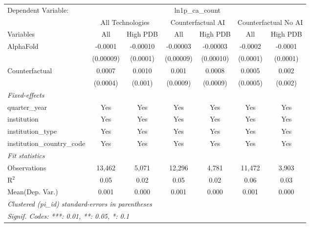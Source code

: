 \begingroup
\centering
\begin{tabular}{lcccccc}
   \tabularnewline \midrule \midrule
   Dependent Variable: & \multicolumn{6}{c}{ln1p\_ca\_count}\\
 & \multicolumn{2}{c}{All Technologies} & \multicolumn{2}{c}{Counterfactual AI} & \multicolumn{2}{c}{Counterfactual No AI} \\
\cmidrule(lr){1-1}\cmidrule(lr){2-3} \cmidrule(lr){4-5} \cmidrule(lr){6-7}
Variables & \multicolumn{1}{c}{All} & \multicolumn{1}{c}{High PDB} & \multicolumn{1}{c}{All} & \multicolumn{1}{c}{High PDB} & \multicolumn{1}{c}{All} & \multicolumn{1}{c}{High PDB} \\
\cmidrule(lr){1-1}\cmidrule(lr){2-2} \cmidrule(lr){3-3} \cmidrule(lr){4-4} \cmidrule(lr){5-5} \cmidrule(lr){6-6} \cmidrule(lr){7-7}
   AlphaFold                    & -0.0001   & -0.00010 & -0.00003  & -0.00003  & -0.0002  & -0.0001\\   
                                & (0.00009) & (0.0001) & (0.00009) & (0.00010) & (0.0001) & (0.0001)\\   
   Counterfactual               & 0.0007    & 0.0010   & 0.001     & 0.0008    & 0.0005   & 0.002\\   
                                & (0.0004)  & (0.001)  & (0.0009)  & (0.0009)  & (0.0005) & (0.002)\\   
   \midrule
   \emph{Fixed-effects}\\
   quarter\_year                & Yes       & Yes      & Yes       & Yes       & Yes      & Yes\\  
   institution                  & Yes       & Yes      & Yes       & Yes       & Yes      & Yes\\  
   institution\_type            & Yes       & Yes      & Yes       & Yes       & Yes      & Yes\\  
   institution\_country\_code   & Yes       & Yes      & Yes       & Yes       & Yes      & Yes\\  
   \midrule
   \emph{Fit statistics}\\
   Observations                 & 13,462    & 5,071    & 12,296    & 4,781     & 11,472   & 3,903\\  
   R$^2$                        & 0.05      & 0.02     & 0.05      & 0.02      & 0.06     & 0.03\\  
Mean(Dep. Var.) & 0.001 & 0.000 & 0.001 & 0.000 & 0.001 & 0.000 \\
   \midrule \midrule
   \multicolumn{7}{l}{\emph{Clustered (pi\_id) standard-errors in parentheses}}\\
   \multicolumn{7}{l}{\emph{Signif. Codes: ***: 0.01, **: 0.05, *: 0.1}}\\
\end{tabular}
\par\endgroup
